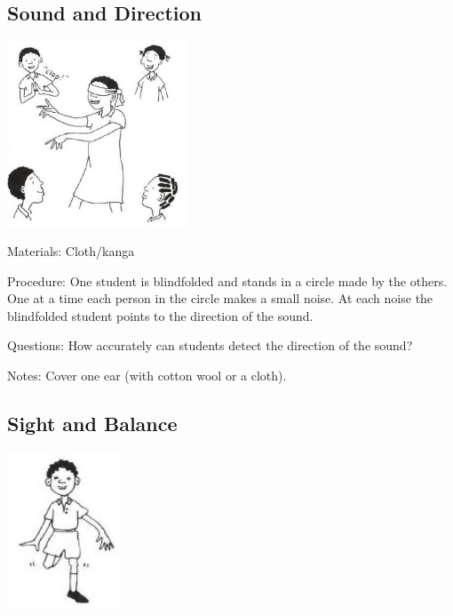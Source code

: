 \begin{multicols}{2}
\columnbreak

\subsection{Sound and Direction}

\begin{center}
\includegraphics[width=0.4\textwidth]{./img/vso/sound-direction.jpg}
\end{center}

\begin{description*}
\item[Materials:]{Cloth/kanga}
\item[Procedure:]{One student is blindfolded and
stands in a circle made by the
others. One at a time each person
in the circle makes a small noise.
At each noise the blindfolded
student points to the direction of
the sound.}
\item[Questions:]{How accurately can students
detect the direction of the sound?}
\item[Notes:]{Cover one ear (with cotton wool
or a cloth).}
\end{description*}

\subsection{Sight and Balance}

\begin{center}
\includegraphics[width=0.25\textwidth]{./img/vso/sight-balance.jpg}
\end{center}


\end{multicols}
